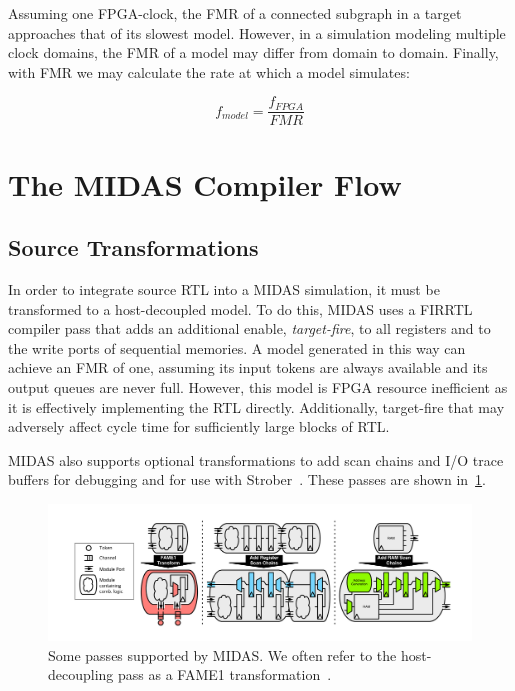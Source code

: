 \noindent Assuming one FPGA-clock, the FMR of a connected subgraph in a target
approaches that of its slowest model. However, in a simulation modeling
multiple clock domains, the FMR of a model may differ from domain to domain.
Finally, with FMR we may calculate the rate at which a model simulates:

$$ f_{model} = \frac{f_{FPGA}}{FMR} $$

\section{The MIDAS Compiler Flow}

\subsection{Source Transformations}\label{sec:source-transformations}

In order to integrate source RTL into a MIDAS simulation, it must be
transformed to a host-decoupled model.  To do this, MIDAS uses a
FIRRTL compiler pass that adds an additional enable, \emph{target-fire}, to all
registers and to the write ports of sequential memories. A model generated in
this way can achieve an FMR of one, assuming its input tokens are always
available and its output queues are never full.  However, this model is FPGA
resource inefficient as it is effectively implementing the RTL directly.
Additionally, target-fire that may adversely affect cycle time for sufficiently
large blocks of RTL.

MIDAS also supports optional transformations to add scan chains and I/O trace
buffers for debugging and for use with Strober~\cite{strober}. These passes
are shown in~\ref{fig:midas-passes}.

\begin{figure}
	\centering
	\includegraphics[width=16cm]{figures/midas-passes.pdf}
    \caption{Some passes supported by MIDAS. We often refer to the
    host-decoupling pass as a FAME1 transformation~\cite{fame}.}
	\label{fig:midas-passes}
	\centering
\end{figure}

